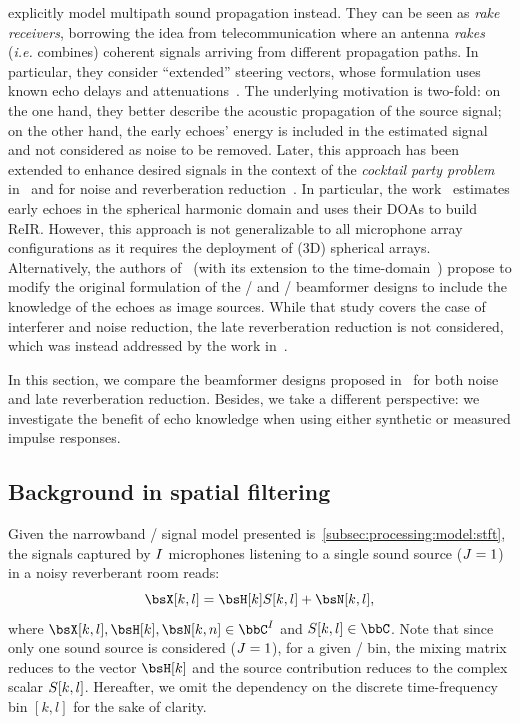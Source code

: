  explicitly model multipath sound propagation instead.
They can be seen as \textit{rake receivers}, borrowing the idea from telecommunication where an antenna \textit{rakes} (\textit{i.e.} combines) coherent signals arriving from different propagation paths.
In particular, they consider ``extended'' steering vectors, whose formulation uses known echo delays and attenuations~.
The underlying motivation is two-fold:
on the one hand, they better describe the acoustic propagation of the source signal; on the other hand, the early echoes' energy is included in the estimated signal and not considered as noise to be removed.
Later, this approach has been extended to enhance desired signals in the context of the \textit{cocktail party problem} in~ and for noise and reverberation reduction~.
In particular, the work~ estimates early echoes in the spherical harmonic domain and uses their \acp{DOA} to build \ac{ReIR}.
However, this approach is not generalizable to all microphone array configurations as it requires the deployment of (3D) spherical arrays.
Alternatively, the authors of~ (with its extension to the time-domain~) propose to modify the original formulation of the \DStxt/ and \MVDRtxt/ beamformer designs to include the knowledge of the echoes as image sources.
While that study covers the case of interferer and noise reduction, the late reverberation reduction is not considered, which was instead addressed by the work in~.

\mynewline
In this section, we compare the beamformer designs proposed in~ for both noise and late reverberation reduction.
Besides, we take a different perspective: we investigate the benefit of echo knowledge when using either synthetic or measured impulse responses.

\subsection{Background in spatial filtering}
Given the narrowband \STFT/ signal model presented is~\cref{subsec:processing:model:stft}, the signals captured by $I$ microphones listening to a single sound source ($J=1$) in a noisy reverberant room reads:
\begin{equation}
    \MICS[k,l] = \FLTS[k] \SRC[k, l]+ \NSES[k,l]
    ,
\end{equation}
where $\MICS[k,l], \FLTS[k], \NSES[k,n] \in \bbC^{\numMics}$ and $\SRC[k,l] \in \bbC$.
Note that since only one sound source is considered ($J=1$), for a given \TF/ bin, the mixing matrix reduces to the vector $\FLTS[k]$ and the source contribution reduces to the complex scalar $S[k,l]$.
Hereafter, we omit the dependency on the discrete time-frequency bin $[k,l]$ for the sake of clarity.

